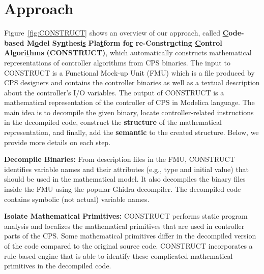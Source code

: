 \documentclass[10pt,conference]{IEEEtran}
\newcommand*\squared[1]{\tikz[baseline=(char.base)]{
\node[shape=rectangle,font=\bfseries,thin,draw=black,fill=yellow,text=black,inner sep=1pt] (char) {#1};}}
\begin{document}
\section{Approach}
\label{sec:Construct}
Figure~\ref{fig:CONSTRUCT} shows an overview of our approach, called \textbf{\underline{C}ode-based M\underline{o}del Sy\underline{n}thesi\underline{s} Pla\underline{t}form fo\underline{r} re-Constr\underline{u}cting \underline{C}ontrol Algori\underline{t}hms} \textsc{\textbf{(CONSTRUCT)}}, which automatically constructs mathematical representations of controller algorithms from CPS binaries. The input to \textsc{CONSTRUCT} is a Functional Mock-up Unit (FMU) which is a file produced by CPS designers and contains the controller binaries as well as a textual description about the controller's I/O variables. The output of \textsc{CONSTRUCT} is a mathematical representation of the controller of CPS in Modelica language. The main idea is to decompile the given binary, locate controller-related instructions in the decompiled code, construct the \textbf{structure} of the mathematical representation, and finally, add the \textbf{semantic} to the created structure. Below, we provide more details on each step.

    \squared{1} \textbf{Decompile Binaries:} From description files in the FMU, \textsc{CONSTRUCT} identifies variable names and their attributes (e.g., type and initial value) that should be used in the mathematical model. It also decompiles the binary files inside the FMU using the popular Ghidra decompiler. The decompiled code contains symbolic (not actual) variable names. 
    
    \squared{2} \textbf{Isolate Mathematical Primitives:} CONSTRUCT performs static program analysis and localizes the mathematical primitives that are used in controller parts of the CPS. Some mathematical primitives differ in the decompiled version of the code compared to the original source code. CONSTRUCT incorporates a rule-based engine that is able to identify these complicated mathematical primitives in the decompiled code. 
    
\end{document}
